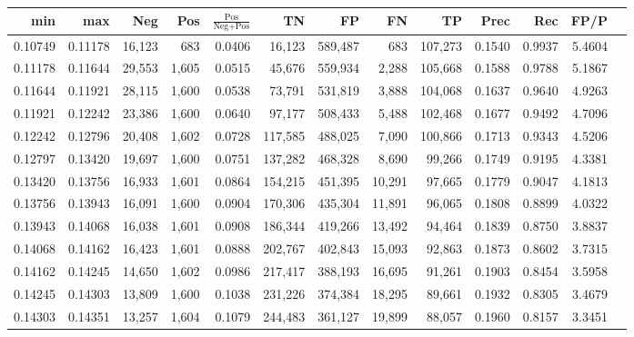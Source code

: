 \begin{tabular}{rrrrrrrrrrrrr}
\toprule
    min &     max &    Neg &   Pos & $\frac{\text{Pos}}{\text{Neg}+\text{Pos}}$ &      TN &      FP &      FN &      TP &   Prec &    Rec &   FP/P \\
\midrule
0.10749 & 0.11178 & 16,123 &   683 &                                     0.0406 &  16,123 & 589,487 &     683 & 107,273 & 0.1540 & 0.9937 & 5.4604 \\
0.11178 & 0.11644 & 29,553 & 1,605 &                                     0.0515 &  45,676 & 559,934 &   2,288 & 105,668 & 0.1588 & 0.9788 & 5.1867 \\
0.11644 & 0.11921 & 28,115 & 1,600 &                                     0.0538 &  73,791 & 531,819 &   3,888 & 104,068 & 0.1637 & 0.9640 & 4.9263 \\
0.11921 & 0.12242 & 23,386 & 1,600 &                                     0.0640 &  97,177 & 508,433 &   5,488 & 102,468 & 0.1677 & 0.9492 & 4.7096 \\
0.12242 & 0.12796 & 20,408 & 1,602 &                                     0.0728 & 117,585 & 488,025 &   7,090 & 100,866 & 0.1713 & 0.9343 & 4.5206 \\
0.12797 & 0.13420 & 19,697 & 1,600 &                                     0.0751 & 137,282 & 468,328 &   8,690 &  99,266 & 0.1749 & 0.9195 & 4.3381 \\
0.13420 & 0.13756 & 16,933 & 1,601 &                                     0.0864 & 154,215 & 451,395 &  10,291 &  97,665 & 0.1779 & 0.9047 & 4.1813 \\
0.13756 & 0.13943 & 16,091 & 1,600 &                                     0.0904 & 170,306 & 435,304 &  11,891 &  96,065 & 0.1808 & 0.8899 & 4.0322 \\
0.13943 & 0.14068 & 16,038 & 1,601 &                                     0.0908 & 186,344 & 419,266 &  13,492 &  94,464 & 0.1839 & 0.8750 & 3.8837 \\
0.14068 & 0.14162 & 16,423 & 1,601 &                                     0.0888 & 202,767 & 402,843 &  15,093 &  92,863 & 0.1873 & 0.8602 & 3.7315 \\
0.14162 & 0.14245 & 14,650 & 1,602 &                                     0.0986 & 217,417 & 388,193 &  16,695 &  91,261 & 0.1903 & 0.8454 & 3.5958 \\
0.14245 & 0.14303 & 13,809 & 1,600 &                                     0.1038 & 231,226 & 374,384 &  18,295 &  89,661 & 0.1932 & 0.8305 & 3.4679 \\
0.14303 & 0.14351 & 13,257 & 1,604 &                                     0.1079 & 244,483 & 361,127 &  19,899 &  88,057 & 0.1960 & 0.8157 & 3.3451 \\

\end{tabular}
